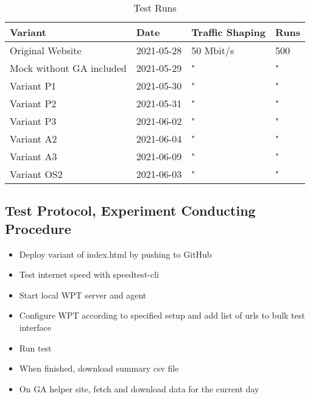 \begin{table}[h]
	\small
	\centering
	\begin{tabular}{ | l | l | l | l | } 
	 \hline
	  Variant \cellcolor{lightgrey} &  Date \cellcolor{lightgrey} & Traffic Shaping \cellcolor{lightgrey} & Runs \cellcolor{lightgrey} \\
	  \hline
	  Original Website & 2021-05-28 & 50 Mbit/s & 500 \\
	  Mock without GA included & 2021-05-29 & " & " \\
	  \hline
	  Variant P1 & 2021-05-30 & " & " \\
	  Variant P2 & 2021-05-31 & " & " \\
	  Variant P3 & 2021-06-02 & " & " \\
	  \hline
	  Variant A2 & 2021-06-04 & " & " \\
	  Variant A3 & 2021-06-09 & " & " \\
	  \hline
	  Variant OS2 & 2021-06-03 & " & " \\
	  \hline
	  \end{tabular}
	\medskip
	\caption{Test Runs}
	\label{table:test_runs}
\end{table}



\subsection{Test Protocol, Experiment Conducting Procedure}

\begin{itemize}
\item Deploy variant of index.html by pushing to GitHub
\item Test internet speed with speedtest-cli
\item Start local WPT server and agent
\item Configure WPT according to specified setup and add list of urls to bulk test interface
\item Run test
\item When finished, download summary csv file
\item On GA helper site, fetch and download data for the current day
\end{itemize}




